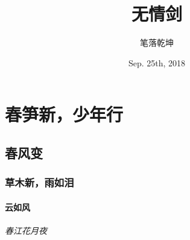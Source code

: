 \documentclass{book}
\begin{document}
	\title{无情剑}
	\author{笔落乾坤}
     \date{Sep. 25th, 2018}
     \maketitle
     \tableofcontents
     \part{春笋新，少年行}
         \chapter{春风变}
             \section{草木新，雨如泪} 
                 \subsection{云如风}
                     \paragraph{春江花月夜}
\end{document}
